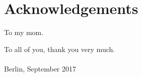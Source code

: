\documentclass[11pt, english, singlespacing, headsepline, ]{MastersDoctoralThesis}
\theoremstyle{definition}
\begin{document}


\chapter*{Acknowledgements}\pagestyle{empty}
To my mom.

To all of you, thank you very much.
\\
\\

Berlin, September 2017 



\pagestyle{empty} 
\tableofcontents%










\end{document}
